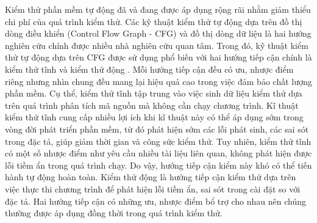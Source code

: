 Kiểm thử phần mềm tự động đã và đang được áp dụng rộng rãi nhằm giảm thiểu chi phí của quá trình kiểm thử. Các kỹ thuật kiểm thử tự động dựa trên đồ thị dòng điều khiển (Control Flow Graph - CFG) và đồ thị dòng dữ liệu là hai hướng nghiên cứu chính được nhiều nhà nghiên cứu quan tâm. Trong đó, kỹ thuật kiểm thử tự động dựa trên CFG được sử dụng phổ biến với hai hướng tiếp cận chính là kiểm thử tĩnh \cite{SecureProgrammingWithStaticAnalysis, Buckle:1998:StaticAnalysisofSafetyCriticalSoftwareTechniquesToolsandExperiences} và kiểm thử động \cite{Grigorenko:1998:DynamicTesting, TUNG2022106821}. Mỗi hướng tiếp cận đều có ưu, nhược điểm riêng nhưng nhìn chung đều mang lại hiệu quả cao trong việc đảm bảo chất lượng phần mềm. Cụ thể, kiểm thử tĩnh tập trung vào việc sinh dữ liệu kiểm thử dựa trên quá trình phân tích mã nguồn mà không cần chạy chương trình. Kĩ thuật kiểm thử tĩnh cung cấp nhiều lợi ích khi kĩ thuật này có thể áp dụng sớm trong vòng đời phát triển phần mềm, từ đó phát hiện sớm các lỗi phát sinh, các sai sót trong đặc tả, giúp giảm thời gian và công sức kiểm thử. Tuy nhiên, kiểm thử tĩnh có một số nhược điểm như yêu cầu nhiều tài liệu liên quan, không phát hiện được lỗi tiềm ẩn trong quá trình chạy. Do vậy, hướng tiếp cận kiểm này khó có thể tiến hành tự động hoàn toàn. Kiểm thử động là hướng tiếp cận kiểm thử dựa trên việc thực thi chương trình để phát hiện lỗi tiềm ẩn, sai sót trong cài đặt so với đặc tả. Hai hướng tiếp cận có những ưu, nhược điểm bổ trợ cho nhau nên chúng thường được áp dụng đồng thời trong quá trình kiểm thử. 

